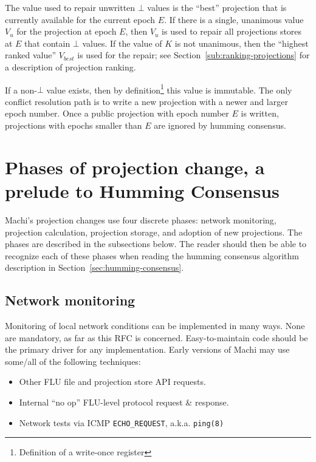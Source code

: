 \documentclass[preprint,10pt]{sigplanconf}
\begin{document}
The value used to repair unwritten $\bot$ values is the ``best'' projection that
is currently available for the current epoch $E$.  If there is a single,
unanimous value $V_{u}$ for the projection at epoch $E$, then $V_{u}$
is used to repair all projections stores at $E$ that contain $\bot$
values.  If the value of $K$ is not unanimous, then the ``highest
ranked value'' $V_{best}$ is used for the repair; see
Section~\ref{sub:ranking-projections} for a description of projection
ranking.

If a non-$\bot$ value exists, then by definition\footnote{Definition
  of a write-once register} this value is immutable.  The only
conflict resolution path is to write a new projection with a newer and
larger epoch number. Once a public projection with epoch number $E$ is
written, projections with epochs smaller than $E$ are ignored by
humming consensus.

\section{Phases of projection change, a prelude to Humming Consensus}
\label{sec:phases-of-projection-change}

Machi's projection changes use four discrete phases: network monitoring,
projection calculation, projection storage, and
adoption of new projections.  The phases are described in the
subsections below.  The reader should then be able to recognize each
of these phases when reading the humming consensus algorithm
description in Section~\ref{sec:humming-consensus}.

\subsection{Network monitoring}
\label{sub:network-monitoring}

Monitoring of local network conditions can be implemented in many
ways.  None are mandatory, as far as this RFC is concerned.
Easy-to-maintain code should be the primary driver for any
implementation.  Early versions of Machi may use some/all of the
following techniques:

\begin{itemize}
\item Other FLU file and projection store API requests.
\item Internal ``no op'' FLU-level protocol request \& response.
\item Network tests via ICMP {\tt ECHO\_REQUEST}, a.k.a. {\tt ping(8)}
\end{itemize}
\end{document}
